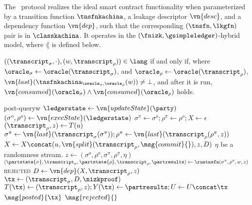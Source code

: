 \begin{protocol}{\kachina}
  The \kachina\ protocol realizes the ideal smart contract functionality when
  parameterized by a transition function $\tnsfnkachina$, a leakage descriptor
  $\vn{desc}$, and a dependency function $\vn{dep}$, such that the corresponding
  $(\tnsfn, \lkgfn)$ pair is in $\classkachina$. It operates in
  the $(\fnizk, \gsimpleledger)$-hybrid model, where $\lang$ is
  defined below.

  $((\transcript_\sigma, \cdot), (w, \transcript_\rho)) \in \lang$ if and only
  if, where $\oracle_\sigma \gets \oracle(\transcript_\sigma)$, and
  $\oracle_\rho \gets \oracle(\transcript_\rho)$,
  $\vn{last}(\tnsfnkachina_{\oracle_\sigma, \oracle_\rho}(w))\allowbreak\neq \bot$, and after it is run,
  $\vn{consumed}(\oracle_\sigma) \land \vn{consumed}(\oracle_\rho)$ holds.

  \begin{statedecl}
  \end{statedecl}

  \begin{receive}{post-query}{w}
    \State \Let $\ledgerstate \gets \vn{updateState}(\party)$
    \State \Let $(\sigma^o, \rho^o) \gets \vn{execState}(\ledgerstate)$
    \State \Let $\sigma^\pi \gets \sigma^o; \rho^\pi \gets \rho^o; X \gets \epsilon$
      \State \Let $(\transcript_\rho, z) \gets T(u)$
      \State \Let $\sigma^\pi \gets \vn{last}(\transcript_\sigma(\sigma^\pi)); \rho^\pi
        \gets \vn{last}(\transcript_\rho(\rho^\pi, z))$
      \State \Let $X \gets X \concat (u, \vn{split}(\transcript_\rho,
        \msg{commit}{}), z, D)$
    \EndFor
    \State \Let $\eta$ be a randomness stream.
    \State \Let $z \gets (\sigma^o, \rho^o, \sigma^\pi, \rho^\pi, \eta)$
    \State \Let $(\partstate{\sigma}, \transcript_\sigma, \partstate{\rho}, \transcript_\rho, \partresults) \gets
      \runtnsfn(\sigma^\pi, \rho^\pi,w, z)$
      \State \Return \textsc{rejected}
    \EndIf
    \State \Let $D \gets \vn{dep}(X, \transcript_\rho, z)$
      \State \Let $\tx \gets (\transcript_\sigma, D, \nizkproof)$
      \State \Let $T(\tx) \gets (\transcript_\rho, z); Y(\tx) \gets \partresults; U \gets U
        \concat \tx$
      \State {}
      \State \Return $\msg{posted}{\tx}$
    \Else
      \State \Return $\msg{rejected}{}$
    \EndIf
  \end{receive}


\end{protocol}
